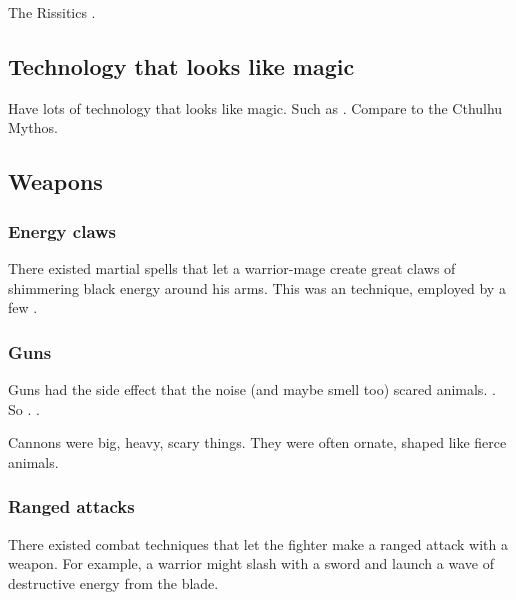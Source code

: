 The Rissitics .









\subsection{Technology that looks like magic}
Have lots of technology that looks like magic. 
Such as .
Compare to the Cthulhu Mythos. 









\subsection{Weapons}





\subsubsection{Energy claws}
There existed martial spells that let a warrior-mage create great claws of shimmering black energy around his arms. 
This was an \ophidian technique, employed by a few \rethyaxes. 





\subsubsection{Guns}
Guns had the side effect that the noise (and maybe smell too) scared animals. 
.
So .
\Murocs {}.  

Cannons were big, heavy, scary things.
They were often ornate, shaped like fierce animals. 





\subsubsection{Ranged \melee attacks}
There existed combat techniques that let the fighter make a ranged attack with a \melee weapon. 
For example, a warrior might slash with a sword and launch a wave of destructive energy from the blade. 

